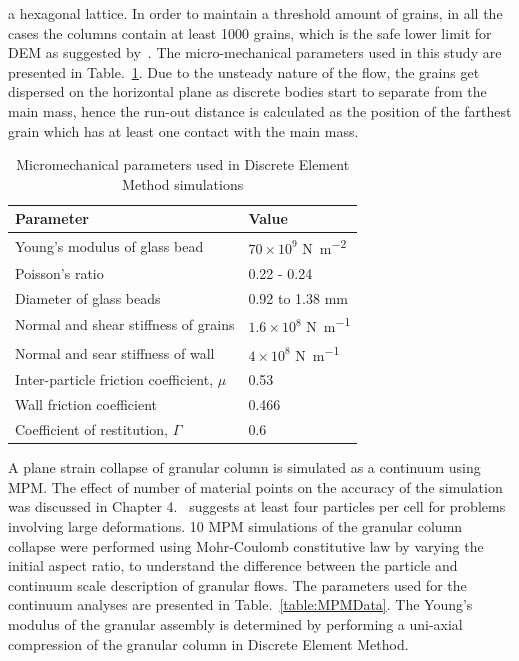 a hexagonal lattice. In order to maintain a threshold amount of grains, in all 
the cases the columns contain at least 1000 grains, which is the safe lower 
limit for DEM as suggested by~\citet{Oda1999}. The micro-mechanical parameters 
used in this study are presented in Table.~\ref{table:MDdata}. Due to the 
unsteady nature of the flow, the grains get dispersed on the horizontal plane 
as discrete bodies start to separate from the main mass, hence the run-out 
distance is calculated as the position of the farthest grain which has at least 
one contact with the main mass.
\begin{table}
\caption{Micromechanical parameters used in Discrete Element Method simulations}
\label{table:MDdata}
\centering
\begin{tabular}{ll}
\toprule
\textbf{Parameter} & \textbf{Value} \\ \midrule
Young's modulus of glass bead & $70\times10^{9}$ \si{\newton\per\m\squared}\\ 
Poisson's ratio & 0.22 - 0.24\\ 
Diameter of glass beads & 0.92 to 1.38 \si{\mm}\\
Normal and shear stiffness of grains & $1.6 \times 10^{8}$ \si{\newton\per\m}\\ 
Normal and sear stiffness of wall & $4 \times 10^{8}$ \si{\newton\per\m}\\
Inter-particle friction coefficient, $\mu$ & 0.53 \\
Wall friction coefficient & 0.466 \\ 
Coefficient of restitution, $\Gamma$ & 0.6 \\ \bottomrule
\end{tabular}
\end{table}
A plane strain collapse of granular column is simulated as a continuum using 
MPM. The effect of number of material points on the accuracy of the simulation 
was discussed in Chapter 4.~\citet{Guilkey2003} suggests at least four 
particles per cell for problems involving large deformations. 10 MPM 
simulations of the granular column collapse were performed using Mohr-Coulomb 
constitutive law by varying the initial aspect ratio, to understand the 
difference between the particle and continuum scale description of granular 
flows. The parameters used for the continuum analyses are presented in 
Table.~\ref{table:MPMData}. The Young's modulus of the granular assembly is 
determined by performing a uni-axial compression of the granular column in 
Discrete Element Method.

